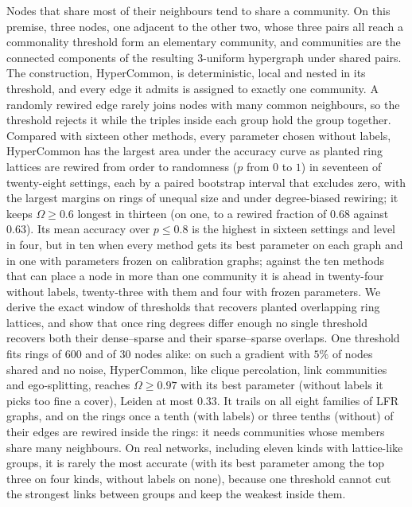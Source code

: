 Nodes that share most of their neighbours tend to share a community. On this premise,
three nodes, one adjacent to the other two, whose three pairs all reach a commonality
threshold form an elementary community, and communities are the connected components of
the resulting 3-uniform hypergraph under shared pairs. The construction, HyperCommon, is
deterministic, local and nested in its threshold, and every edge it admits is assigned to exactly one community. A randomly rewired edge rarely joins nodes with many common neighbours, so the threshold rejects it while the triples inside each group hold the group together. Compared with sixteen other methods, every parameter chosen without labels, HyperCommon has the largest area under the accuracy curve as planted ring lattices are rewired from order to randomness ($p$ from $0$ to $1$) in seventeen of twenty-eight settings, each by a paired bootstrap interval that excludes zero, with the largest margins on rings of unequal size and under degree-biased rewiring; it keeps $\Omega\ge0.6$ longest in thirteen (on one, to a rewired fraction of $0.68$ against $0.63$). Its mean accuracy over $p\le0.8$ is the highest in sixteen settings and level in four, but in ten when every method gets its best parameter on each graph and in one with parameters frozen on calibration graphs; against the ten methods that can place a node in more than one community it is ahead in twenty-four without labels, twenty-three with them and four with frozen parameters. We derive the exact
window of thresholds that recovers planted overlapping ring lattices, and show that once
ring degrees differ enough no single threshold recovers both their dense--sparse and
their sparse--sparse overlaps. One threshold fits rings of 600 and of 30 nodes alike: on such a gradient with $5\%$ of nodes shared and no noise, HyperCommon, like clique percolation, link communities and ego-splitting, reaches $\Omega\ge0.97$ with its best parameter (without labels it picks too fine a cover), Leiden at most $0.33$. It trails on all eight families of LFR graphs, and on
the rings once a tenth (with labels) or three tenths (without) of their edges are
rewired inside the rings: it needs communities whose members share many neighbours. On real networks, including eleven kinds with lattice-like groups, it is rarely the most accurate (with its best parameter among the top three on four kinds, without labels on none), because one threshold cannot cut the strongest links between groups and keep the weakest inside them.
